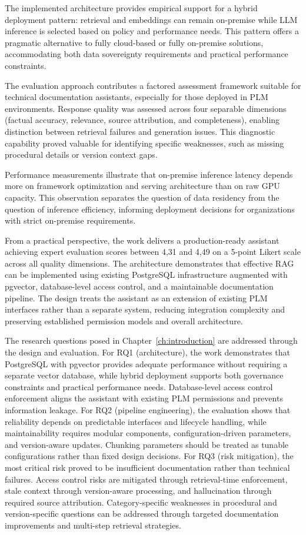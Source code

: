 The implemented architecture provides empirical support for a hybrid deployment pattern: retrieval and embeddings can remain on-premise while LLM inference is selected based on policy and performance needs. This pattern offers a pragmatic alternative to fully cloud-based or fully on-premise solutions, accommodating both data sovereignty requirements and practical performance constraints.

The evaluation approach contributes a factored assessment framework suitable for technical documentation assistants, especially for those deployed in PLM environments. Response quality was assessed across four separable dimensions (factual accuracy, relevance, source attribution, and completeness), enabling distinction between retrieval failures and generation issues. This diagnostic capability proved valuable for identifying specific weaknesses, such as missing procedural details or version context gaps.

Performance measurements illustrate that on-premise inference latency depends more on framework optimization and serving architecture than on raw GPU capacity. This observation separates the question of data residency from the question of inference efficiency, informing deployment decisions for organizations with strict on-premise requirements.

From a practical perspective, the work delivers a production-ready assistant achieving expert evaluation scores between 4,31 and 4,49 on a 5-point Likert scale across all quality dimensions. The architecture demonstrates that effective RAG can be implemented using existing PostgreSQL infrastructure augmented with pgvector, database-level access control, and a maintainable documentation pipeline. The design treats the assistant as an extension of existing PLM interfaces rather than a separate system, reducing integration complexity and preserving established permission models and overall architecture.

The research questions posed in Chapter~\ref{ch:introduction} are addressed through the design and evaluation. For RQ1 (architecture), the work demonstrates that PostgreSQL with pgvector provides adequate performance without requiring a separate vector database, while hybrid deployment supports both governance constraints and practical performance needs. Database-level access control enforcement aligns the assistant with existing PLM permissions and prevents information leakage. For RQ2 (pipeline engineering), the evaluation shows that reliability depends on predictable interfaces and lifecycle handling, while maintainability requires modular components, configuration-driven parameters, and version-aware updates. Chunking parameters should be treated as tunable configurations rather than fixed design decisions. For RQ3 (risk mitigation), the most critical risk proved to be insufficient documentation rather than technical failures. Access control risks are mitigated through retrieval-time enforcement, stale context through version-aware processing, and hallucination through required source attribution. Category-specific weaknesses in procedural and version-specific questions can be addressed through targeted documentation improvements and multi-step retrieval strategies.


